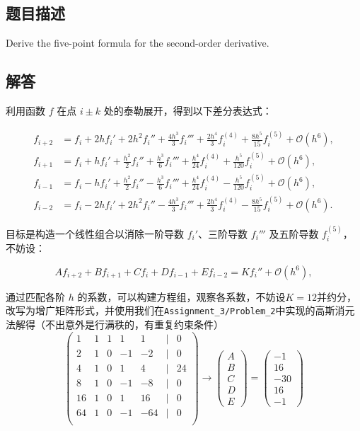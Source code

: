 \subsection{题目描述}
\noindent Derive the five-point formula for the second-order derivative.

\subsection{解答}
利用函数 \( f \) 在点 \( i \pm k \) 处的泰勒展开，得到以下差分表达式：

\[
\begin{aligned}
f_{i+2} &= f_i + 2 h f_i' + 2 h^2 f_i'' + \frac{4 h^3}{3} f_i''' + \frac{2 h^4}{3} f_i^{(4)} + \frac{8 h^5}{15} f_i^{(5)} + \mathcal{O}(h^6), \\
f_{i+1} &= f_i + h f_i' + \frac{h^2}{2} f_i'' + \frac{h^3}{6} f_i''' + \frac{h^4}{24} f_i^{(4)} + \frac{h^5}{120} f_i^{(5)} + \mathcal{O}(h^6), \\
f_{i-1} &= f_i - h f_i' + \frac{h^2}{2} f_i'' - \frac{h^3}{6} f_i''' + \frac{h^4}{24} f_i^{(4)} - \frac{h^5}{120} f_i^{(5)} + \mathcal{O}(h^6), \\
f_{i-2} &= f_i - 2 h f_i' + 2 h^2 f_i'' - \frac{4 h^3}{3} f_i''' + \frac{2 h^4}{3} f_i^{(4)} - \frac{8 h^5}{15} f_i^{(5)} + \mathcal{O}(h^6).
\end{aligned}
\]

目标是构造一个线性组合以消除一阶导数 \( f_i' \)、三阶导数 \( f_i''' \) 及五阶导数 \( f_i^{(5)} \)，不妨设：

\[
A f_{i+2} + B f_{i+1} + C f_i + D f_{i-1} + E f_{i-2} = K f_i'' + \mathcal{O}(h^6),
\]

通过匹配各阶 \( h \) 的系数，可以构建方程组，观察各系数，不妨设\( K = 12 \)并约分，改写为增广矩阵形式，并使用我们在\texttt{Assignment\_3/Problem\_2}中实现的高斯消元法解得（不出意外是行满秩的，有重复约束条件）
\[
\begin{pmatrix}
1 & 1 & 1 & 1 & 1 & | & 0 \\
2 & 1 & 0 & -1 & -2 & | & 0 \\
4 & 1 & 0 & 1 & 4 & | & 24 \\
8 & 1 & 0 & -1 & -8 & | & 0 \\
16 & 1 & 0 & 1 & 16 & | & 0 \\
64 & 1 & 0 & -1 & -64 & | & 0 \\
\end{pmatrix}
\rightarrow
\begin{pmatrix}
A \\
B \\
C \\
D \\
E 
\end{pmatrix}
= 
\begin{pmatrix}
-1 \\
16 \\
-30 \\
16 \\
-1
\end{pmatrix}
\]

